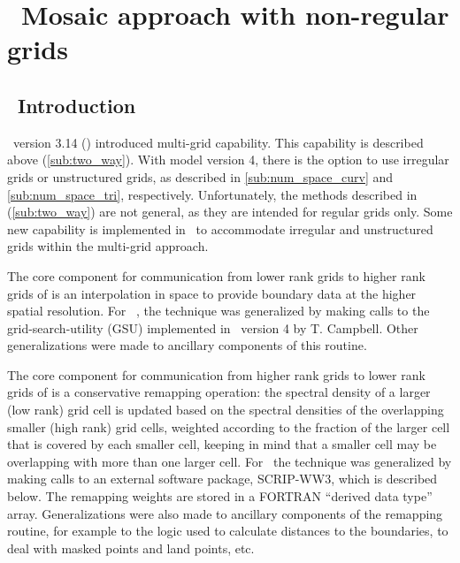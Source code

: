 \pagestyle{myheadings} \setcounter{page}{1} \setcounter{footnote}{0}

\section{~Mosaic approach with non-regular grids} \label{app:scrip}
\newcounters 

\vssub
\subsection{~Introduction} \label{sec:scripA}
\vssub

\noindent
\ws\ version 3.14 (\cite{tol:MMAB09a}) introduced multi-grid capability. This
capability is described above (\para\ref{sub:two_way}). With model version 4,
there is the option to use irregular grids or unstructured grids, as described
in \para\ref{sub:num_space_curv} and \para\ref{sub:num_space_tri},
respectively. Unfortunately, the methods described in (\para\ref{sub:two_way})
are not general, as they are intended for regular grids only. Some new
capability is implemented in \WWver\ to accommodate irregular and unstructured
grids within the multi-grid approach.

The core component for communication from lower rank grids to higher rank
grids of \cite{tol:OMOD08b} is an interpolation in space to provide boundary
data at the higher spatial resolution. For \WWver\ , the technique was
generalized by making calls to the grid-search-utility (GSU) implemented in
\ws\ version 4 by T. Campbell. Other generalizations were made to ancillary
components of this routine.

The core component for communication from higher rank grids to lower rank
grids of \cite{tol:OMOD08b} is a conservative remapping operation: the
spectral density of a larger (low rank) grid cell is updated based on the
spectral densities of the overlapping smaller (high rank) grid cells, weighted
according to the fraction of the larger cell that is covered by each smaller
cell, keeping in mind that a smaller cell may be overlapping with more than
one larger cell. For \WWver\, the technique was generalized by making calls to
an external software package, SCRIP-WW3, which is described below. The
remapping weights are stored in a FORTRAN ``derived data type''
array. Generalizations were also made to ancillary components of the remapping
routine, for example to the logic used to calculate distances to the
boundaries, to deal with masked points and land points, etc.

